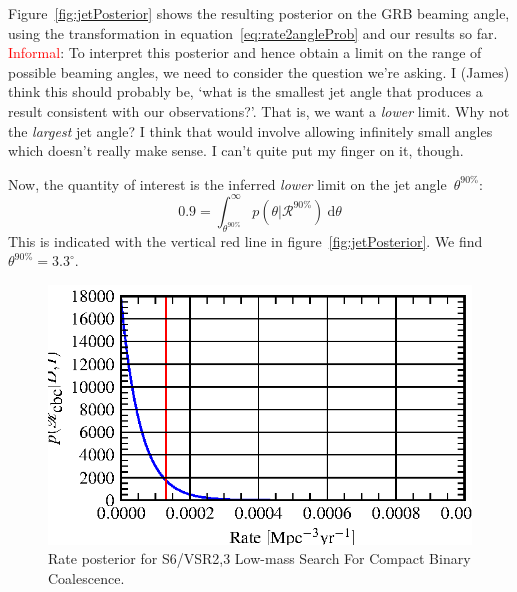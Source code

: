 \documentclass[twocolumn,nofootinbib]{revtex4}
\newcommand{\cbcrate}{{{\mathcal R}}}
\newcommand{\diff}{{\mathrm d}}
\begin{document}
Figure~\ref{fig:jetPosterior} shows the resulting posterior on the GRB
beaming angle, using the transformation in equation~\ref{eq:rate2angleProb} and
our results so far.  \textcolor{red}{Informal}: To interpret this posterior and
hence obtain a limit on the range of possible beaming angles, we need to
consider the question we're asking.  I (James) think this should probably be,
`what is the smallest jet angle that produces a result consistent with our
observations?'.  That is, we want a \emph{lower} limit.  Why not the
\emph{largest} jet angle?  I think that would involve allowing infinitely small
angles which doesn't really make sense.  I can't quite put my finger on it,
though.

Now, the quantity of interest is the inferred \emph{lower}
limit on the jet angle~$\theta^{90\%}$:
%
\begin{equation}
0.9 = \int_{\theta^{90\%}}^{\infty}p(\theta | \cbcrate^{90\%})~\diff \theta
\end{equation}
%
This is indicated with the vertical red line in figure~\ref{fig:jetPosterior}.
We find $\theta^{90\%}=3.3^{\circ}$.


\begin{figure}
\includegraphics{rate_posterior_s6UL.eps}
\caption{Rate posterior for S6/VSR2,3 Low-mass Search For Compact Binary
Coalescence.\label{fig:reconstructedRatePosterior}}
\end{figure}
\end{document}
